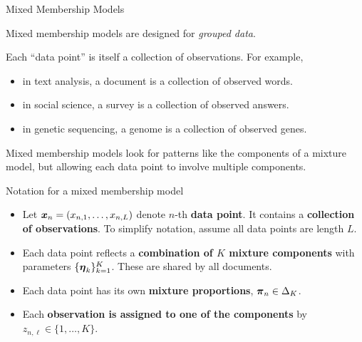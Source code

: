 \documentclass[aspectratio=169]{beamer}
\begin{document}
\begin{frame}{Mixed Membership Models}
    
    Mixed membership models are designed for \textit{grouped data}.
    
    Each ``data point'' is itself a collection of observations. For example,
    \begin{itemize}
        \item in text analysis, a document is a collection of observed words.
        \item in social science, a survey is a collection of observed answers.
        \item in genetic sequencing, a genome is a collection of observed genes.
    \end{itemize}
    
    Mixed membership models look for patterns like the components of a mixture model, but allowing each data point to involve multiple components.
    
\end{frame}


\begin{frame}{Notation for a mixed membership model}
    
\begin{itemize}
    \item Let $\boldsymbol{x}_n = (x_{n,1}, \ldots, x_{n,L})$ denote $n$-th \textbf{data point}. It contains a \textbf{collection of observations}. To simplify notation, assume all data points are length $L$. 

    \item Each data point reflects a \textbf{combination of $K$ mixture components} with parameters $\{\boldsymbol{\eta}_k\}_{k=1}^K$. These are shared by all documents.

    \item Each data point has its own \textbf{mixture proportions}, $\boldsymbol{\pi}_n \in \Delta_K$.

    \item Each \textbf{observation is assigned to one of the components} by $z_{n,\ell} \in \{1, \ldots, K\}$.
\end{itemize}

\end{frame}
\end{document}
